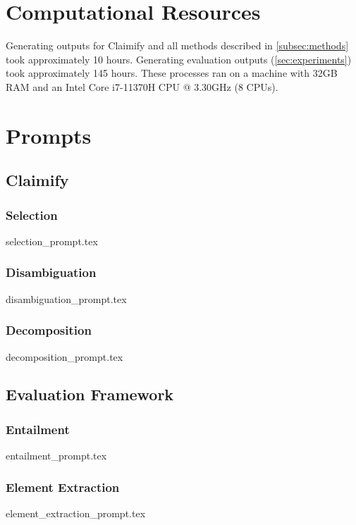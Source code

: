 \section{Computational Resources}
Generating outputs for Claimify and all methods described in \autoref{subsec:methods} took approximately 10 hours. Generating evaluation outputs (\autoref{sec:experiments}) took approximately 145 hours. These processes ran on a machine with 32GB RAM and an Intel Core i7-11370H CPU @ 3.30GHz (8 CPUs).

\clearpage

\onecolumn
\section{Prompts}

\subsection{Claimify}
\label{app:claimify_prompts}
\subsubsection{Selection}
{selection_prompt.tex}

\subsubsection{Disambiguation}
{disambiguation_prompt.tex}

\subsubsection{Decomposition}
{decomposition_prompt.tex}

\subsection{Evaluation Framework}
\label{app:eval_prompts}
\subsubsection{Entailment}
{entailment_prompt.tex}

\subsubsection{Element Extraction}
\label{app:element_extraction}
{element_extraction_prompt.tex}


